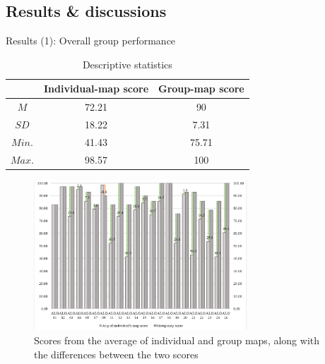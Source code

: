 \subsection{Results \& discussions}
\begin{frame}[allowframebreaks]{Results (1): Overall group performance}
\begin{table}[tb]
    \caption{Descriptive statistics}
    \label{a1::group_performance}
    \begin{center}
        \begin{tabular}{c|c|c}
            \hline
            & Individual-map score & Group-map score\\
            \hline
            $M$ & 72.21 & 90 \\
            $SD$ & 18.22 & 7.31 \\
            $Min.$ & 41.43 & 75.71 \\
            $Max.$ & 98.57 & 100 \\
            \hline
        \end{tabular}
    \end{center}
\end{table}

\begin{figure}[tb]
    \begin{center}
        \includegraphics[width=80mm]{images/a1_mapscore_distribution.pdf}
    \end{center}
    \caption{Scores from the average of individual and group maps, along with the differences between the two scores}
    \label{a1::mapscore_distribution}
\end{figure}


\end{frame}
